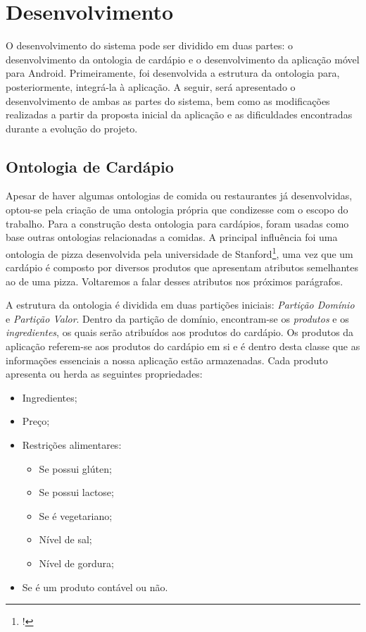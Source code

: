 
\chapter{\label{chap:desenvolvimento}Desenvolvimento}

O desenvolvimento do sistema pode ser dividido em duas partes: o desenvolvimento da ontologia de cardápio e o desenvolvimento da aplicação móvel para Android. Primeiramente, foi desenvolvida a estrutura da ontologia para, posteriormente, integrá-la à aplicação. A seguir, será apresentado o desenvolvimento de ambas as partes do sistema, bem como as modificações realizadas a partir da proposta inicial da aplicação e as dificuldades encontradas durante a evolução do projeto.

\section{Ontologia de Cardápio}

Apesar de haver algumas ontologias de comida ou restaurantes já desenvolvidas, optou-se pela criação de uma ontologia própria que condizesse com o escopo do trabalho. Para a construção desta ontologia para cardápios, foram usadas como base outras ontologias relacionadas a comidas. A principal influência foi uma ontologia de pizza desenvolvida pela universidade de Stanford\footnote{!}, uma vez que um cardápio é composto por diversos produtos que apresentam atributos semelhantes ao de uma pizza. Voltaremos a falar desses atributos nos próximos parágrafos.

A estrutura da ontologia é dividida em duas partições iniciais: \emph{Partição Domínio} e \emph{Partição Valor}. Dentro da partição de domínio, encontram-se os \emph{produtos} e os \emph{ingredientes}, os quais serão atribuídos aos produtos do cardápio. Os produtos da aplicação referem-se aos produtos do cardápio em si e é dentro desta classe que as informações essenciais a nossa aplicação estão armazenadas. Cada produto apresenta ou herda as seguintes propriedades:
\begin{itemize}
	\item Ingredientes;
	\item Preço;
	\item Restrições alimentares:
	\begin{itemize}
		\item Se possui glúten;
		\item Se possui lactose;
		\item Se é vegetariano;
		\item Nível de sal;
		\item Nível de gordura;
	\end{itemize}
	\item Se é um produto contável ou não.
\end{itemize}

